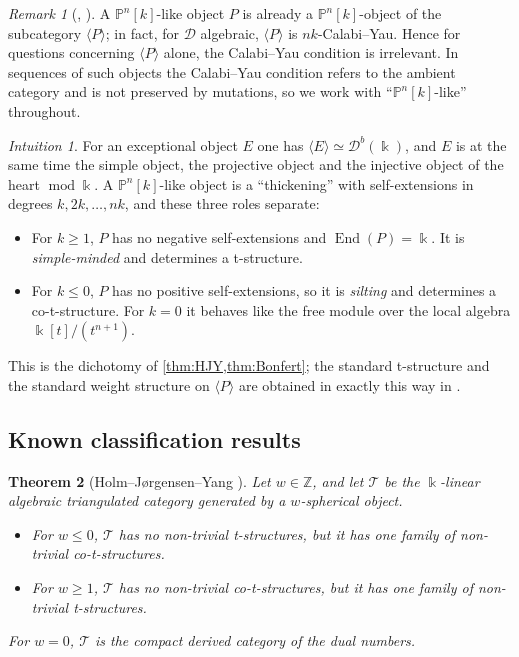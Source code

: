 \documentclass[11pt,reqno]{amsart}
\theoremstyle{plain}
\newtheorem{theorem}{Theorem}[section]
\theoremstyle{definition}
\theoremstyle{remark}
\newtheorem{remark}[theorem]{Remark}
\newtheorem*{intuition}{Intuition}
\newcommand{\kk}{\Bbbk}
\DeclareMathOperator{\End}{End}
\newcommand{\modd}{\operatorname{mod}}
\newcommand{\Db}{\mathcal{D}^b}
\newcommand{\thick}[1]{\langle #1\rangle}
\newcommand{\Pn}[2]{\mathbb{P}^{#1}[#2]}
\newcommand{\cD}{\mathcal{D}}
\newcommand{\cT}{\mathcal{T}}
\begin{document}
\begin{remark}[{\cite[Rem.~2.2]{HK19}, \cite[Lemma~2.5]{Bonf26}}]
A $\Pn nk$-like object $P$ is already a $\Pn nk$-object of the subcategory $\thick P$; in fact, for $\cD$ algebraic, $\thick P$ is $nk$-Calabi--Yau. Hence for questions concerning $\thick P$ alone, the Calabi--Yau condition is irrelevant. In sequences of such objects the Calabi--Yau condition refers to the ambient category and is not preserved by mutations, so we work with ``$\Pn nk$-like'' throughout.
\end{remark}

\begin{intuition}
For an exceptional object $E$ one has $\thick E\simeq\Db(\kk)$, and $E$ is at the same time the simple object, the projective object and the injective object of the heart $\modd\kk$. A $\Pn nk$-like object is a ``thickening'' with self-extensions in degrees $k,2k,\dots,nk$, and these three roles separate:
\begin{itemize}
\item For $k\ge1$, $P$ has no negative self-extensions and $\End(P)=\kk$. It is \emph{simple-minded} and determines a t-structure.
\item For $k\le0$, $P$ has no positive self-extensions, so it is \emph{silting} and determines a co-t-structure. For $k=0$ it behaves like the free module over the local algebra $\kk[t]/(t^{n+1})$.
\end{itemize}
This is the dichotomy of \cref{thm:HJY,thm:Bonfert}; the standard t-structure and the standard weight structure on $\thick P$ are obtained in exactly this way in \cite[\S3.2]{Bonf26}.
\end{intuition}

\subsection{Known classification results}

\begin{theorem}[{Holm--J\o rgensen--Yang \cite{HJY13}}]\label{thm:HJY}
Let $w\in\mathbb{Z}$, and let $\cT$ be the $\kk$-linear algebraic triangulated category generated by a $w$-spherical object.
\begin{itemize}
\item For $w\le0$, $\cT$ has no non-trivial t-structures, but it has one family of non-trivial co-t-structures.
\item For $w\ge1$, $\cT$ has no non-trivial co-t-structures, but it has one family of non-trivial t-structures.
\end{itemize}
For $w=0$, $\cT$ is the compact derived category of the dual numbers.
\end{theorem}
\end{document}

